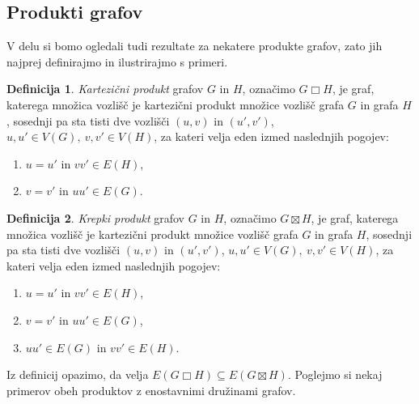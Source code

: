 \documentclass[12pt,a4paper,twoside]{article}
\theoremstyle{definition} %
\newtheorem{definicija}{Definicija}[section]
\theoremstyle{plain} %
\numberwithin{equation}{section}  %
\DeclareMathOperator{\boxempty}{\Box}
\begin{document}
\subsection{Produkti grafov}
V delu si bomo ogledali tudi rezultate za nekatere produkte grafov, zato jih najprej definirajmo in ilustrirajmo s primeri.

\begin{definicija}
    \emph{Kartezični produkt} grafov $G$ in $H$, označimo $G \boxempty H$, je graf, katerega  množica vozlišč je kartezični produkt množice vozlišč grafa $G$ in grafa $H$, sosednji pa sta tisti dve vozlišči $(u, v)$ in $(u', v')$, $u, u' \in V(G),\ v, v' \in V(H)$, za kateri velja eden izmed naslednjih pogojev:
    \begin{enumerate}
        \item $u = u'$ in $vv' \in E(H)$,
        \item $v = v'$ in $uu' \in E(G)$.
    \end{enumerate}
\end{definicija}

\begin{definicija}
    \emph{Krepki produkt} grafov $G$ in $H$, označimo $G \boxtimes H$, je graf, katerega  množica vozlišč je kartezični produkt množice vozlišč grafa $G$ in grafa $H$, sosednji pa sta tisti dve vozlišči $(u, v)$ in $(u', v')$, $u, u' \in V(G),\ v, v' \in V(H)$, za kateri velja eden izmed naslednjih pogojev:
    \begin{enumerate}
        \item $u = u'$ in $vv' \in E(H)$,
        \item $v = v'$ in $uu' \in E(G)$,
        \item $uu' \in E(G)$ in $vv' \in E(H)$.
    \end{enumerate}
\end{definicija}

Iz definicij opazimo, da velja $E(G \boxempty H) \subseteq E(G \boxtimes H)$. Poglejmo si  nekaj primerov obeh produktov z enostavnimi družinami grafov.
\end{document}
